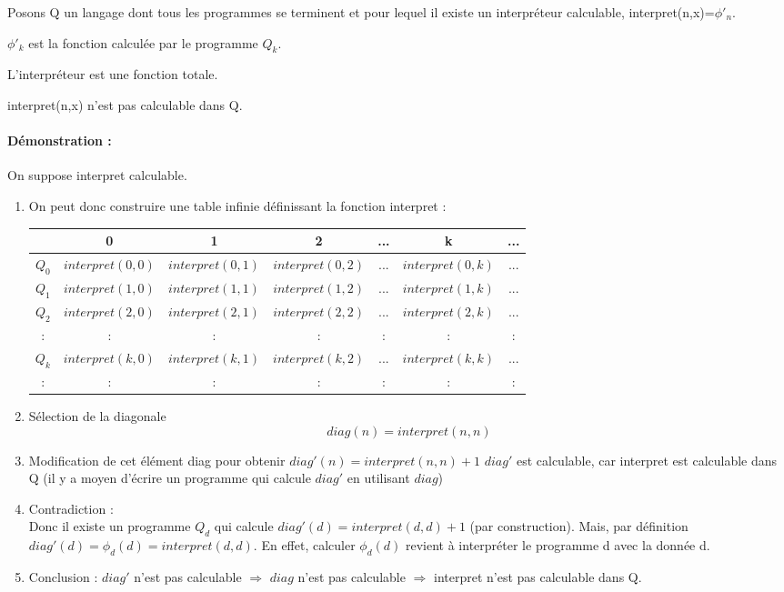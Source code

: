 \begin{mydef}
	Posons Q un langage dont tous les programmes se terminent et pour 
	lequel il existe un interpréteur calculable, interpret(n,x)=$\phi'_n$.
\end{mydef}
	
\begin{mydef}
	$\phi'_k$ est la fonction calculée par le programme $Q_k$.
\end{mydef}

\begin{myprop}
	 L'interpréteur est une fonction totale.
\end{myprop}

\begin{mytheo}
	\label{Hoare_Allison}
	interpret(n,x) n'est pas calculable dans Q.\\
\end{mytheo}

\paragraph{Démonstration :}
On suppose interpret calculable. 
\begin{enumerate}
	\item On peut donc construire une table infinie définissant la fonction
		interpret : \\
		\begin{tabular}{|c||c|c|c|c|c|c|}
			\hline
			& 0 & 1 & 2 & ... & k & ... \\
			\hline
			$Q_0$ & $interpret(0,0)$ & $interpret(0,1)$ & $interpret(0,2)$ & ... & $interpret(0,k)$ & ... \\
			$Q_1$ & $interpret(1,0)$ & $interpret(1,1)$ & $interpret(1,2)$ & ... & $interpret(1,k)$ & ... \\
			$Q_2$ & $interpret(2,0)$ & $interpret(2,1)$ & $interpret(2,2)$ & ... & $interpret(2,k)$ & ... \\
			: & : &:& : & : & : &:\\
			$Q_k$ & $interpret(k,0)$ & $interpret(k,1)$ & $interpret(k,2)$ & ... & $interpret(k,k)$ & ... \\
			: & : &:& : & : & : &:\\
			\hline
		\end{tabular}
	\item Sélection de la diagonale 
		\[diag(n) = interpret(n,n)\]
	\item Modification de cet élément diag pour obtenir
		$diag'(n) = interpret(n,n)+1$ 
		$diag'$ est calculable, car interpret est calculable dans Q (il y a moyen
		d'écrire un programme qui calcule $diag'$ en utilisant $diag$)
	\item Contradiction :\\
	       	Donc il existe un programme $Q_d$ qui calcule
		$diag'(d) = interpret(d,d)+1$ (par construction).
		Mais, par définition $diag'(d) = \phi_d(d) = interpret(d,d)$.
		En effet, calculer $\phi_d(d)$ revient à interpréter le programme
		d avec la donnée d.
	\item Conclusion : $diag'$ n'est pas calculable $ \Rightarrow $ $diag$
	n'est pas calculable $ \Rightarrow $ interpret n'est pas calculable
dans Q.
\end{enumerate}

